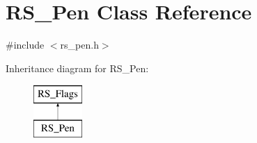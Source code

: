 \hypertarget{classRS__Pen}{\section{R\-S\-\_\-\-Pen Class Reference}
\label{classRS__Pen}
}


{\ttfamily \#include $<$rs\-\_\-pen.\-h$>$}

Inheritance diagram for R\-S\-\_\-\-Pen\-:\begin{figure}[H]
\begin{center}
\leavevmode
\includegraphics[height=2.000000cm]{classRS__Pen}
\end{center}
\end{figure}
